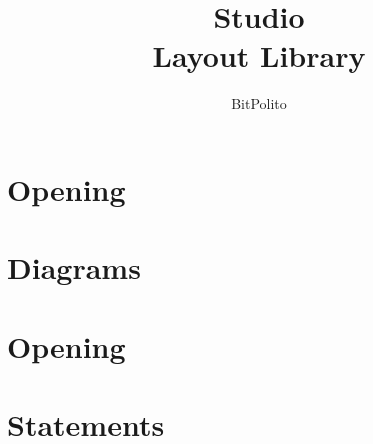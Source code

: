 \documentclass[aspectratio=169]{beamer}
\title{Studio\\Layout Library}
\author{BitPolito}
\institute{Editable slide templates}
\date{}
\begin{document}
\section{Opening}
\gdef\studiocataloguename{\detokenize{cover}}
\gdef\studiocataloguename{\detokenize{contents}}
\gdef\studiocataloguename{\detokenize{section-divider}}
\gdef\studiocataloguename{\detokenize{tabbed-agenda}}
\gdef\studiocataloguename{\detokenize{cover-light}}
\gdef\studiocataloguename{\detokenize{cover-photo}}
\section{Diagrams}
\gdef\studiocataloguename{\detokenize{cover-script-blue}}
\section{Opening}
\gdef\studiocataloguename{\detokenize{cover-dashboard}}
\gdef\studiocataloguename{\detokenize{cover-wide-title}}
\gdef\studiocataloguename{\detokenize{agenda-with-icons}}
\gdef\studiocataloguename{\detokenize{agenda-with-schedule}}
\section{Statements}
\gdef\studiocataloguename{\detokenize{statement-arrow}}
\gdef\studiocataloguename{\detokenize{glow-statement}}
\gdef\studiocataloguename{\detokenize{blue-statement}}
\gdef\studiocataloguename{\detokenize{icon-spotlight-light}}
\gdef\studiocataloguename{\detokenize{icon-spotlight-blue}}
\gdef\studiocataloguename{\detokenize{oversized-word}}
\gdef\studiocataloguename{\detokenize{chat-dialogue}}
\gdef\studiocataloguename{\detokenize{speech-panel}}
\gdef\studiocataloguename{\detokenize{chat-three-messages}}
\gdef\studiocataloguename{\detokenize{oversized-number-light}}
\gdef\studiocataloguename{\detokenize{oversized-number-blue}}
\gdef\studiocataloguename{\detokenize{diagonal-photo-title}}
\gdef\studiocataloguename{\detokenize{title-paragraphs}}
\gdef\studiocataloguename{\detokenize{title-centered-paragraphs}}
\end{document}
